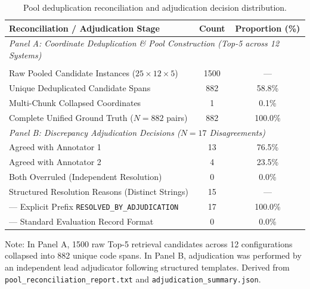 \begin{table}[t]
\caption{Pool deduplication reconciliation and adjudication decision distribution.}
\label{tab:pool_reconciliation_adjudication}
\centering\footnotesize
\setlength{\tabcolsep}{10pt}
\begin{threeparttable}
\begin{tabular}{@{}lcc@{}}
\toprule
Reconciliation / Adjudication Stage & Count & Proportion (\%) \\
\midrule
\multicolumn{3}{l}{\textit{Panel A: Coordinate Deduplication \& Pool Construction (Top-5 across 12 Systems)}} \\\\[2pt]
Raw Pooled Candidate Instances ($25 \times 12 \times 5$) & 1500 & --- \\
Unique Deduplicated Candidate Spans & 882 & 58.8\% \\
Multi-Chunk Collapsed Coordinates & 1 & 0.1\% \\
Complete Unified Ground Truth ($N=882$ pairs) & 882 & 100.0\% \\[2pt]
\midrule
\multicolumn{3}{l}{\textit{Panel B: Discrepancy Adjudication Decisions ($N=17$ Disagreements)}} \\[2pt]
Agreed with Annotator 1 & 13 & 76.5\% \\
Agreed with Annotator 2 & 4 & 23.5\% \\
Both Overruled (Independent Resolution) & 0 & 0.0\% \\
Structured Resolution Reasons (Distinct Strings) & 15 & --- \\
--- Explicit Prefix \texttt{RESOLVED\_BY\_ADJUDICATION} & 17 & 100.0\% \\
--- Standard Evaluation Record Format & 0 & 0.0\% \\
\bottomrule
\end{tabular}
\begin{tablenotes}\footnotesize
\item[] Note: In Panel A, 1500 raw Top-5 retrieval candidates across 12 configurations collapsed into 882 unique code spans. In Panel B, adjudication was performed by an independent lead adjudicator following structured templates. Derived from \texttt{pool\_reconciliation\_report.txt} and \texttt{adjudication\_summary.json}.
\end{tablenotes}
\end{threeparttable}
\end{table}